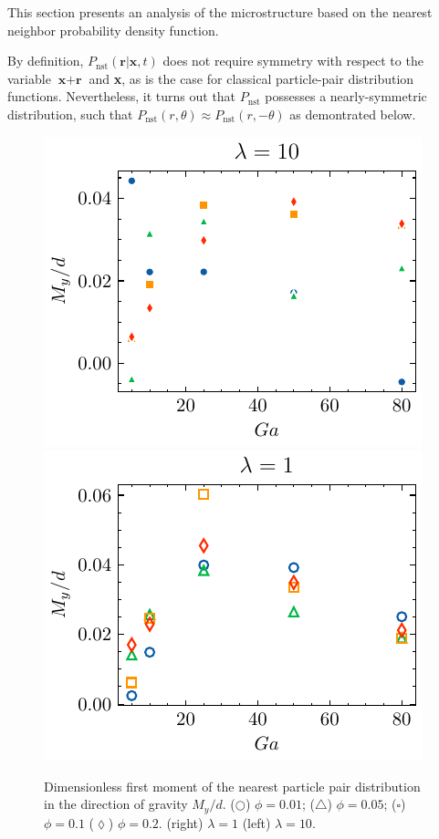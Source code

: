 This section presents an analysis of the microstructure based on the nearest neighbor probability density function. 


By definition, $P_\text{nst}(\textbf{r}|\textbf{x},t)$ does not require symmetry with respect to the variable $\textbf{x}+\textbf{r}$ and \textbf{x}, as is the case for classical particle-pair distribution functions. 
Nevertheless, it turns out that $P_\text{nst}$ possesses a nearly-symmetric distribution, such that  $P_\text{nst}(r,\theta)\approx P_\text{nst}(r,- \theta)$ as demontrated below.
\begin{figure}[h!]
    \centering
    \includegraphics[height = 0.3\textwidth]{image/HOMOGENEOUS_final/PA/Ry_l_10.pdf}
    \includegraphics[height = 0.3\textwidth]{image/HOMOGENEOUS_final/PA/Ry_l_1.pdf}
    \caption{ Dimensionless first moment of the nearest particle pair distribution in the direction of gravity $M_y/d$. 
    ($\pmb\bigcirc$) $\phi = 0.01$; ($\pmb\triangle$) $ \phi = 0.05$; ($\pmb\square$) $\phi = 0.1$ ($\pmb\lozenge$) $\phi = 0.2$.
    (right)  $\lambda  = 1$
    (left)  $\lambda  = 10$.
    }
    \label{fig:ap:RY}
\end{figure}
